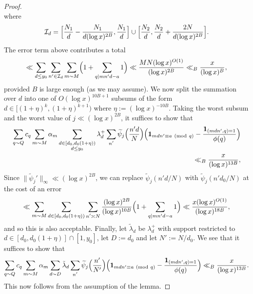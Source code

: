 \documentclass[10pt]{amsart}
\theoremstyle{plain}
\numberwithin{equation}{section}
\newcommand{\Mod}[1]{\ (\mathrm{mod}\ #1)}
\begin{document}
\begin{proof}
\[\]
where 
\[
\mathcal{I}_d=\Bigl[\frac{N_1}{d}-\frac{N_1}{d(\log{x})^{2B}},\frac{N_1}{d}\Bigr]\cup\Bigl[\frac{N_2}{d},\frac{N_2}{d}+\frac{2N}{d(\log{x})^{2B}}\Bigr].
\]
The error term above contributes a total
\[
\ll \sum_{d\le y_0}\sum_{n'\in\mathcal{I}_d}\sum_{m\sim M}\Bigl(1+\sum_{q| m n' d-a}1\Bigr)\ll \frac{MN(\log{x})^{O(1)}}{(\log{x})^{2B}}\ll_B \frac{x}{(\log{x})^B},
\]
provided $B$ is large enough (as we may assume). We now split the summation over $d$ into one of $O(\log{x})^{10 B+1}$ subsums of the form $d\in [(1+\eta)^k,(1+\eta)^{k+1})$ where $\eta:=(\log{x})^{-10 B}$. Taking the worst subsum and the worst value of $j\ll (\log{x})^{2B}$, it suffices to show that
\begin{align*}
\sum_{q\sim Q}c_q \sum_{m\sim M}\alpha_m\sum_{\substack{d\in [d_0,d_0(1+\eta))\\ d\le y_0}}\lambda^+_d \sum_{\substack{n'}}\widetilde{\psi}_j\Bigl(\frac{n' d}{N}\Bigr)\Bigl(\mathbf{1}_{m d n'\equiv a\Mod{q}}-\frac{\mathbf{1}_{(m d n',q)=1}}{\phi(q)}\Bigr)\\
\ll_B \frac{x}{(\log{x})^{13 B}},
\end{align*}
Since $\|\widetilde{\psi}_j'\|_\infty\ll (\log{x})^{2B}$, we can replace $\widetilde{\psi}_j(n'd/N)$ with $\widetilde{\psi}_j(n' d_0/N)$ at the cost of an error
\[
\ll \sum_{m\sim M}\sum_{\substack{d\in [d_0,d_0(1+\eta))}}\sum_{\substack{n'\asymp N}}\frac{(\log{x})^{2B}}{(\log{x})^{10B}}\Bigl(1+\sum_{q|m n' d-a}1\Bigr)\ll \frac{x(\log{x})^{O(1)}}{(\log{x})^{18B}},
\]
and so this is also acceptable. Finally, let $\tilde{\lambda}_d$ be $\lambda^+_d$ with support restricted to $d\in [d_0,d_0(1+\eta)]\cap[1,y_0]$, let $D:=d_0$ and let $N':=N/d_0$. We see that it suffices to show that
\[
\sum_{q\sim Q}c_q \sum_{m\sim M}\alpha_m\sum_{\substack{d\sim D}}\tilde{\lambda}_d \sum_{\substack{n'}}\widetilde{\psi}_j\Bigl(\frac{n'}{N'}\Bigr)\Bigl(\mathbf{1}_{m d n'\equiv a\Mod{q}}-\frac{\mathbf{1}_{(m d n',q)=1}}{\phi(q)}\Bigr)\ll_B \frac{x}{(\log{x})^{13 B}}.
\]
This now follows from the assumption of the lemma.
\end{proof}
%
%
%
%
%
%
%
%
%
%
%
%
%
%
%
%
%
%
%
\end{document}
